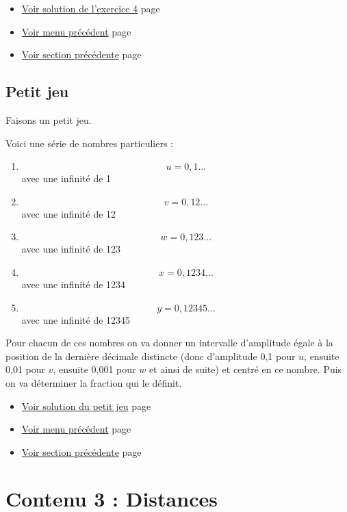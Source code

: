\documentclass[a4paper,11pt]{book}
\begin{document}
\begin{itemize}
\item \hyperref[orgea731a5]{Voir solution de l'exercice 4}
page~\pageref{page:sec8.2.2sol4}
\item \hyperref[org6170d36]{Voir menu précédent}
page~\pageref{page:content2-menu}
\item \hyperref[org61fbd6f]{Voir section précédente}
page~\pageref{page:sec2.2.2exo3}
\end{itemize}

\clearpage

\section{Petit jeu}
\label{sec:org16e3375}
\label{org2b18515}
\label{page:sec2.2.4small-game}

Faisons un petit jeu.

Voici une série de nombres particuliers :

\begin{enumerate}
\item \[u = 0,1\dots\] avec une infinité de 1
\item \[v = 0,12\dots\] avec une infinité de 12
\item \[w = 0,123\dots\] avec une infinité de 123
\item \[x = 0,1234\dots\] avec une infinité de 1234
\item \[y = 0,12345\dots\] avec une infinité de 12345
\end{enumerate}


Pour chacun de ces nombres on va donner un intervalle d'amplitude
égale à la position de la dernière décimale distincte (donc
d'amplitude 0,1 pour \(u\), ensuite 0,01 pour \(v\),
ensuite 0,001 pour \(w\) et ainsi de suite) et centré en ce
nombre. Puis on va déterminer la fraction qui le définit.


\begin{itemize}
\item \hyperref[org727e50c]{Voir solution du petit jeu}
page~\pageref{page:sec8.2.3sol-game}
\item \hyperref[org6170d36]{Voir menu précédent}
page~\pageref{page:content2-menu}
\item \hyperref[org6c6db0c]{Voir section précédente}
page~\pageref{page:sec2.2.3exo4}
\end{itemize}

\clearpage

\chapter{Contenu 3 : Distances}
\label{sec:org4ebd38b}
\label{org0ecf993}
\label{page:sec2.3content3}
\end{document}

